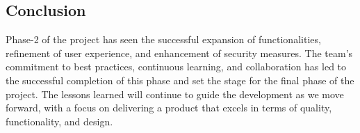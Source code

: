 \documentclass[11pt]{article}
\begin{document}
\subsection{Conclusion}
\label{sec:orgfc35f79}

Phase-2 of the project has seen the successful expansion of functionalities,
refinement of user experience, and enhancement of security measures. The team's
commitment to best practices, continuous learning, and collaboration has led to
the successful completion of this phase and set the stage for the final phase of
the project. The lessons learned will continue to guide the development as we
move forward, with a focus on delivering a product that excels in terms of
quality, functionality, and design. 
\end{document}

